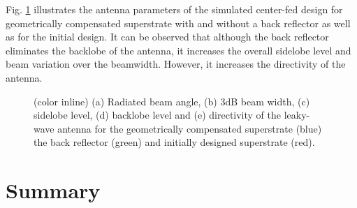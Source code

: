 %
%
Fig. \ref{fig:centeradpattern} illustrates the antenna parameters of the simulated center-fed design for geometrically compensated superstrate with and without a back reflector as well as for the initial design. It can be observed that although the back reflector eliminates the backlobe of the antenna, it increases the overall sidelobe level and beam variation over the beamwidth. However, it increases the directivity of the antenna.

\begin{figure} [t!]
	\begin{center}
		
	\end{center}
  \caption[Characterization plots comparing the angle of radiation, sidelobe level, backlobe level, 3dB beamwidth and directivity of the center-fed antenna over a broad bandwidth.]{(color inline) (a) Radiated beam angle, (b) 3dB beam width, (c) sidelobe level, (d) backlobe level and (e) directivity of the leaky-wave antenna for the geometrically compensated superstrate (blue) the back reflector (green) and initially designed superstrate (red).}
\label{fig:centeradpattern}
\end{figure}

\section{Summary}

